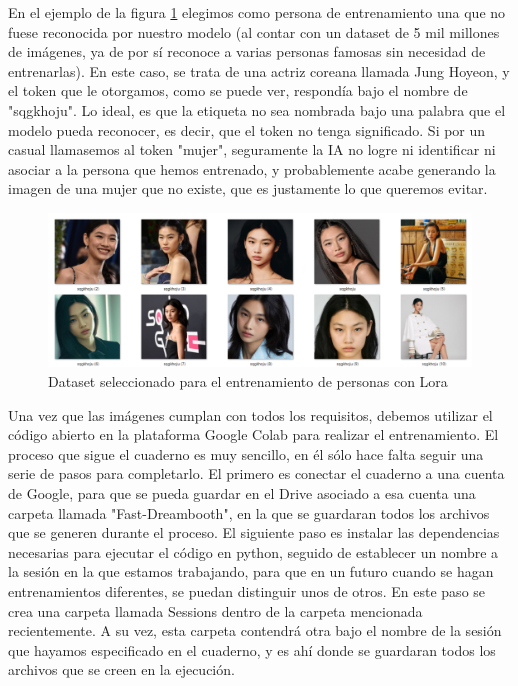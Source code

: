 En el ejemplo de la figura \ref{fig:datasethoyeon}  elegimos como persona de entrenamiento una que no fuese reconocida por nuestro modelo (al contar con un dataset de 5 mil millones de imágenes, ya de por sí reconoce a varias personas famosas sin necesidad de entrenarlas). En este caso, se trata de una actriz coreana llamada Jung Hoyeon, y el token que le otorgamos, como se puede ver, respondía bajo el nombre de "sqgkhoju". Lo ideal, es que la etiqueta no sea nombrada bajo una palabra que el modelo pueda reconocer, es decir, que el token no tenga significado. Si por un casual llamasemos al token "mujer", seguramente la IA no logre ni identificar ni asociar a la persona que hemos entrenado, y probablemente acabe generando la imagen de una mujer que no existe, que es justamente lo que queremos evitar. \\

\begin{figure}[h]
	\centering
	\includegraphics[width = 1
	\textwidth]{Imagenes/Vectorial/datasethoyeon.png}
	\caption{Dataset seleccionado para el entrenamiento de personas con Lora}
	\label{fig:datasethoyeon}
\end{figure}

Una vez que las imágenes cumplan con todos los requisitos, debemos utilizar el código abierto en la plataforma Google Colab para realizar el entrenamiento. 
El proceso que sigue el cuaderno es muy sencillo, en él sólo hace falta seguir una serie de pasos para completarlo. El primero es conectar el cuaderno a una cuenta de Google, para que se pueda guardar en el Drive asociado a esa cuenta una carpeta llamada "Fast-Dreambooth", en la que se guardaran todos los archivos que se generen durante el proceso. El siguiente paso es instalar las dependencias necesarias para ejecutar el código en python, seguido de establecer un nombre a la sesión en la que estamos trabajando, para que en un futuro cuando se hagan entrenamientos diferentes, se puedan distinguir unos de otros. En este paso se crea una carpeta llamada Sessions dentro de la carpeta mencionada recientemente. A su vez, esta carpeta contendrá otra bajo el nombre de la sesión que hayamos especificado en el cuaderno, y es ahí donde se guardaran todos los archivos que se creen en la ejecución. 

